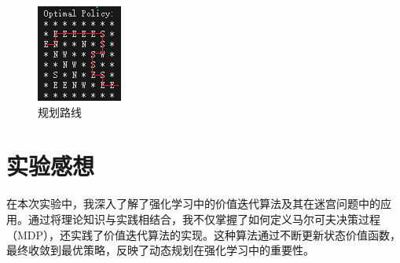 \documentclass{article}
\begin{document}
\begin{figure}[H]
\begin{minipage}{0.35\linewidth}
        \includegraphics[width=\linewidth]{./image/image2.png}
        \caption{规划路线}
    \end{minipage}
\end{figure}

\section{实验感想}
在本次实验中，我深入了解了强化学习中的价值迭代算法及其在迷宫问题中的应用。通过将理论知识与实践相结合，我不仅掌握了如何定义马尔可夫决策过程（MDP），还实践了价值迭代算法的实现。这种算法通过不断更新状态价值函数，最终收敛到最优策略，反映了动态规划在强化学习中的重要性。
\end{document}
